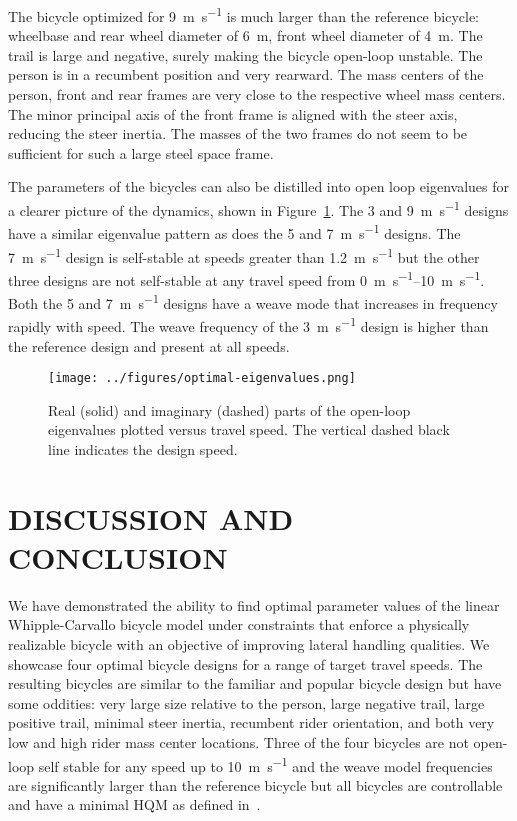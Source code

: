 \documentclass{bmd2019p}
\begin{document}
The bicycle optimized for 9~\si{\meter\per\second} is much larger than the
reference bicycle: wheelbase and rear wheel diameter of 6~\si{\meter}, front
wheel diameter of 4~\si{\meter}. The trail is large and negative, surely making
the bicycle open-loop unstable. The person is in a recumbent position and very
rearward. The mass centers of the person, front and rear frames are very close
to the respective wheel mass centers. The minor principal axis of the front
frame is aligned with the steer axis, reducing the steer inertia. The masses of
the two frames do not seem to be sufficient for such a large steel space frame.

The parameters of the bicycles can also be distilled into open loop eigenvalues
for a clearer picture of the dynamics, shown in
Figure~\ref{fig:optimal-eigenvalues}. The 3 and 9~\si{\meter\per\second}
designs have a similar eigenvalue pattern as does the 5 and
7~\si{\meter\per\second} designs. The 7~\si{\meter\per\second} design is
self-stable at speeds greater than 1.2~\si{\meter\per\second} but the other
three designs are not self-stable at any travel speed from
\SIrange{0}{10}{\meter\per\second}. Both the 5 and 7~\si{\meter\per\second}
designs have a weave mode that increases in frequency rapidly with speed. The
weave frequency of the 3~\si{\meter\per\second} design is higher than the
reference design and present at all speeds.
%
\begin{figure}
  \centering
  \texttt{[image: ../figures/optimal-eigenvalues.png]}
  \label{fig:optimal-eigenvalues}
  \caption{Real (solid) and imaginary (dashed) parts of the open-loop
    eigenvalues plotted versus travel speed. The vertical dashed black line
    indicates the design speed.}
\end{figure}

\section{DISCUSSION AND CONCLUSION}
%
We have demonstrated the ability to find optimal parameter values of the linear
Whipple-Carvallo bicycle model under constraints that enforce a physically
realizable bicycle with an objective of improving lateral handling qualities.
We showcase four optimal bicycle designs for a range of target travel speeds.
The resulting bicycles are similar to the familiar and popular bicycle design
but have some oddities: very large size relative to the person, large negative
trail, large positive trail, minimal steer inertia, recumbent rider
orientation, and both very low and high rider mass center locations. Three of
the four bicycles are not open-loop self stable for any speed up to
10~\si{\meter\per\second} and the weave model frequencies are significantly
larger than the reference bicycle but all bicycles are controllable and have a
minimal HQM as defined in~\cite{Hess2012}.
\end{document}
